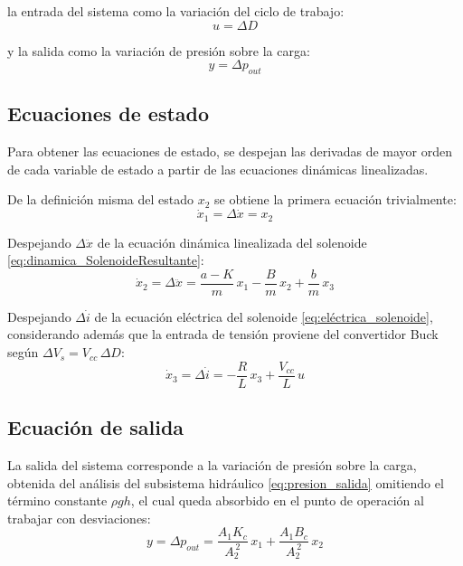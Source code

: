 \documentclass[journal]{IEEEtran}
\begin{document}
la entrada del sistema como la variación del ciclo de trabajo:
\begin{equation}
    u = \Delta D
\label{eq:entrada_sistema}
\end{equation}

y la salida como la variación de presión sobre la carga:
\begin{equation}
    y = \Delta p_{out}
\label{eq:salida_sistema}
\end{equation}

\subsection{Ecuaciones de estado}

Para obtener las ecuaciones de estado, se despejan las derivadas de mayor 
orden de cada variable de estado a partir de las ecuaciones dinámicas 
linealizadas.

\setlength{\parskip}{1em}

De la definición misma del estado $x_2$ se obtiene la primera ecuación 
trivialmente:
\begin{equation}
    \dot{x}_1 = \Delta \dot{x} = x_2
\label{eq:estado1}
\end{equation}

Despejando $\Delta \ddot{x}$ de la ecuación dinámica linealizada del 
solenoide \eqref{eq:dinamica_SolenoideResultante}:
\begin{equation}
    \dot{x}_2 = \Delta \ddot{x} 
              = \frac{a - K}{m}\,x_1 - \frac{B}{m}\,x_2 + \frac{b}{m}\,x_3
\label{eq:estado2}
\end{equation}

Despejando $\Delta \dot{i}$ de la ecuación eléctrica del solenoide 
\eqref{eq:eléctrica_solenoide}, considerando además que la entrada de 
tensión proviene del convertidor Buck según $\Delta V_s = V_{cc}\,\Delta D$:
\begin{equation}
    \dot{x}_3 = \Delta \dot{i} 
              = -\frac{R}{L}\,x_3 + \frac{V_{cc}}{L}\,u
\label{eq:estado3}
\end{equation}

\subsection{Ecuación de salida}

La salida del sistema corresponde a la variación de presión sobre la carga, 
obtenida del análisis del subsistema hidráulico 
\eqref{eq:presion_salida} omitiendo el término constante $\rho g h$, el cual 
queda absorbido en el punto de operación al trabajar con desviaciones:
\begin{equation}
    y = \Delta p_{out} 
      = \frac{A_1 K_c}{A_2^{\,2}}\,x_1 
      + \frac{A_1 B_c}{A_2^{\,2}}\,x_2
\label{eq:ecuacion_salida_estados}
\end{equation}
\end{document}
